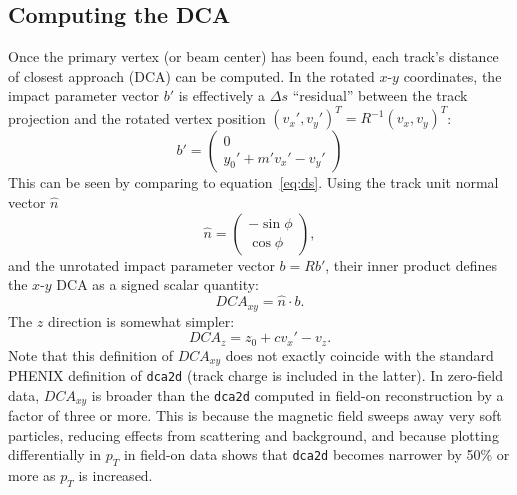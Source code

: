 \documentclass[12pt]{article}
\begin{document}
\subsection{Computing the DCA}
Once the primary vertex (or beam center) has been found, each track's distance of closest approach (DCA) can be computed. In the rotated $x$-$y$ coordinates, the impact parameter vector $b'$ is effectively a $\Delta s$ ``residual'' between the track projection and the rotated vertex position $(v_x', v_y')^T = R^{-1} (v_x, v_y)^T$:
\begin{equation} \label{eq:ipxy}
b' = 
\begin{pmatrix}
0 \\
y_0' + m' v_x' - v_y'
\end{pmatrix}
\end{equation}
This can be seen by comparing to equation~\ref{eq:ds}. Using the track unit normal vector $\hat n$
\begin{equation} \label{eq:nhat}
\hat n = 
\begin{pmatrix}
-\sin \phi \\
\cos \phi
\end{pmatrix},
\end{equation}
and the unrotated impact parameter vector $b = R b'$, their inner product defines the $x$-$y$ DCA as a signed scalar quantity: 
\begin{equation} \label{eq:dcaxy}
DCA_{xy} = \hat n \cdot b.
\end{equation}
The $z$ direction is somewhat simpler:
\begin{equation} \label{eq:dcaz}
DCA_{z} = z_0 + c v_x' - v_z.
\end{equation}
Note that this definition of $DCA_{xy}$ does not exactly coincide with the standard PHENIX definition of \texttt{dca2d} (track charge is included in the latter). In zero-field data, $DCA_{xy}$ is broader than the \texttt{dca2d} computed in field-on reconstruction by a factor of three or more. This is because the magnetic field sweeps away very soft particles, reducing effects from scattering and background, and because plotting differentially in $p_T$ in field-on data shows that \texttt{dca2d} becomes narrower by 50\% or more as $p_T$ is increased. 
\end{document}
